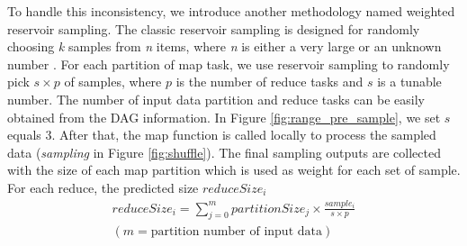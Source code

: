To handle this inconsistency, we introduce another methodology named weighted reservoir sampling. The classic reservoir sampling is designed for randomly choosing \textit{k} samples from \textit{n} items, where \textit{n} is either a very large or an unknown number \cite{reservoir}. For each partition of map task, we use reservoir sampling to randomly pick $s \times p$ of samples, where $p$ is the number of reduce tasks and $s$ is a tunable number. The number of input data partition and reduce tasks can be easily obtained from the DAG information. In Figure \ref{fig:range_pre_sample}, we set $s$ equals $3$. After that, the map function is called locally to process the sampled data (\textit{sampling} in Figure \ref{fig:shuffle}). The final sampling outputs are collected with the size of each map partition which is used as weight for each set of sample. For each reduce, the predicted size $reduceSize_i$
\begin{equation}
\label{equationsample}
\begin{aligned}
	reduceSize_i = {\displaystyle\sum_{j=0}^{m} {partitionSize_j \times \frac{sample_i}{s \times p}}} \\
	{\left( m = \text{partition number of input data} \right)}
\end{aligned}
\end{equation}

